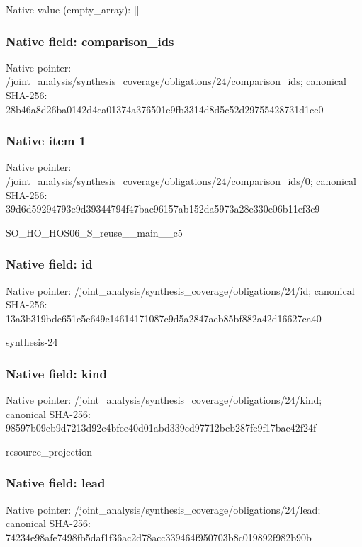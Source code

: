 \documentclass[10pt,a4paper]{article}
\begin{document}
Native value (empty\_\allowbreak{}array): []

\subsubsection{Native field: comparison\_\allowbreak{}ids}
Native pointer: /joint\_\allowbreak{}analysis/synthesis\_\allowbreak{}coverage/obligations/24/comparison\_\allowbreak{}ids; canonical SHA-256: 28b46a8d26ba0142d4ca01374a376501e9fb3314d8d5c52d29755428731d1ce0

\subsubsection{Native item 1}
Native pointer: /joint\_\allowbreak{}analysis/synthesis\_\allowbreak{}coverage/obligations/24/comparison\_\allowbreak{}ids/0; canonical SHA-256: 39d6d59294793e9d39344794f47bae96157ab152da5973a28e330e06b11ef3c9

\begingroup\raggedright\sloppy SO\_\allowbreak{}HO\_\allowbreak{}HOS06\_\allowbreak{}S\_\allowbreak{}reuse\_\allowbreak{}\_\allowbreak{}main\_\allowbreak{}\_\allowbreak{}c5\par\endgroup

\subsubsection{Native field: id}
Native pointer: /joint\_\allowbreak{}analysis/synthesis\_\allowbreak{}coverage/obligations/24/id; canonical SHA-256: 13a3b319bde651e5e649c14614171087c9d5a2847aeb85bf882a42d16627ca40

\begingroup\raggedright\sloppy synthesis-24\par\endgroup

\subsubsection{Native field: kind}
Native pointer: /joint\_\allowbreak{}analysis/synthesis\_\allowbreak{}coverage/obligations/24/kind; canonical SHA-256: 98597b09cb9d7213d92c4bfee40d01abd339cd97712bcb287fe9f17bac42f24f

\begingroup\raggedright\sloppy resource\_\allowbreak{}projection\par\endgroup

\subsubsection{Native field: lead}
Native pointer: /joint\_\allowbreak{}analysis/synthesis\_\allowbreak{}coverage/obligations/24/lead; canonical SHA-256: 74234e98afe7498fb5daf1f36ac2d78acc339464f950703b8c019892f982b90b
\end{document}

